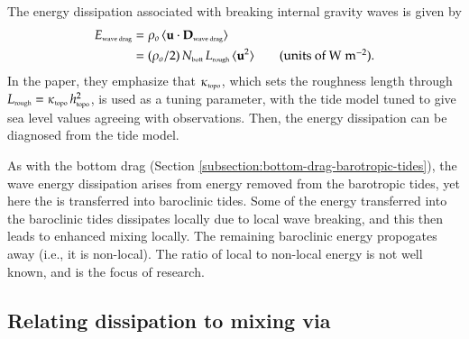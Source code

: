 The energy dissipation associated with breaking internal gravity waves
is given by
\begin{equation}
\begin{split}
 E_{\mbox{\tiny wave drag}} &=
  \rho_{o} \, \langle {\bf u} \cdot {\bf D}_{\mbox{\tiny wave drag}} \rangle 
 \\
 &=
   (\rho_{o}/2) \, N_{\mbox{\tiny bott}}  \,  L_{\mbox{\tiny rough}}
   \,  \langle {\bf u}^{2} \rangle  
 \qquad \mbox{(units of $\mbox{W} \; \mbox{m}^{-2}$).}
\end{split}
\label{eq:wave-energy-flux}
\end{equation}
In the \cite{Jayne_etal2001} paper, they emphasize that
$\kappa_{\mbox{\tiny topo}}$, which sets the roughness length through
$L_{\mbox{\tiny rough}} = \kappa_{\mbox{\tiny topo}} \, h_{\mbox{\tiny
    topo}}^{2}$, is used as a tuning parameter, with the tide model
tuned to give sea level values agreeing with observations.  Then, the
energy dissipation can be diagnosed from the tide model.

As with the bottom drag (Section
\ref{subsection:bottom-drag-barotropic-tides}), the wave energy
dissipation arises from energy removed from the barotropic tides, yet
here the is transferred into baroclinic tides.  Some of the energy
transferred into the baroclinic tides dissipates locally due to local
wave breaking, and this then leads to enhanced mixing locally.  The
remaining baroclinic energy propogates away (i.e., it is non-local).
The ratio of local to non-local energy is not well known, and is the
focus of research.   


\subsection{Relating dissipation to mixing via \cite{Osborn1980}}

